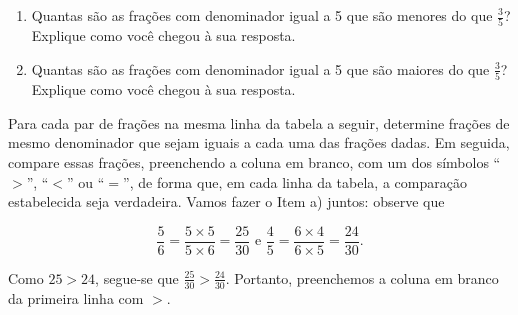 \begin{atividade}{}

\begin{enumerate} [\quad a)] %
  \item     Quantas são as frações com denominador igual a 5 que são menores do que $\frac{3}{5}$? Explique como você chegou à sua resposta.
  \item     Quantas são as frações com denominador igual a 5 que são maiores do que $\frac{3}{5}$? Explique como você chegou à sua resposta.
\end{enumerate} %
\end{atividade}



\begin{atividade}{}

Para cada par de frações na mesma linha da tabela a seguir, determine frações de mesmo denominador que sejam iguais a cada uma das frações dadas. Em seguida, compare essas frações, preenchendo a coluna em branco, com um dos símbolos ``$>$'', ``$<$'' ou ``$=$'', de forma que, em cada linha da tabela, a comparação estabelecida seja verdadeira. Vamos fazer o Item a) juntos: observe que

$$\frac{5}{6} = \frac{5 \times 5}{5 \times 6} = \frac{25}{30} \text{ e } \frac{4}{5} = \frac{6 \times 4}{6 \times 5} = \frac{24}{30}.$$

Como $25 > 24$, segue-se que $\frac{25}{30} > \frac{24}{30}$. Portanto, preenchemos a coluna em branco da primeira linha com $>$.



\end{atividade}
